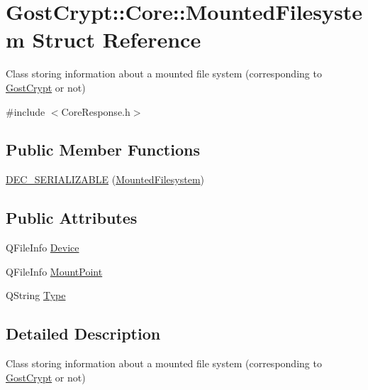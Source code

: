 \hypertarget{struct_gost_crypt_1_1_core_1_1_mounted_filesystem}{}\section{Gost\+Crypt\+:\+:Core\+:\+:Mounted\+Filesystem Struct Reference}
\label{struct_gost_crypt_1_1_core_1_1_mounted_filesystem}


Class storing information about a mounted file system (corresponding to \hyperlink{namespace_gost_crypt}{Gost\+Crypt} or not)  




{\ttfamily \#include $<$Core\+Response.\+h$>$}

\subsection*{Public Member Functions}
\begin{DoxyCompactItemize}
\item 
\hyperlink{struct_gost_crypt_1_1_core_1_1_mounted_filesystem_a3679182396a02d8728b5ff4d5c363edd}{D\+E\+C\+\_\+\+S\+E\+R\+I\+A\+L\+I\+Z\+A\+B\+LE} (\hyperlink{struct_gost_crypt_1_1_core_1_1_mounted_filesystem}{Mounted\+Filesystem})
\end{DoxyCompactItemize}
\subsection*{Public Attributes}
\begin{DoxyCompactItemize}
\item 
Q\+File\+Info \hyperlink{struct_gost_crypt_1_1_core_1_1_mounted_filesystem_a3284108b3f0deb35fb27848f5c5ed3ee}{Device}
\item 
Q\+File\+Info \hyperlink{struct_gost_crypt_1_1_core_1_1_mounted_filesystem_a122ef9f2f725100c1cfb1d71fcab73c1}{Mount\+Point}
\item 
Q\+String \hyperlink{struct_gost_crypt_1_1_core_1_1_mounted_filesystem_a8ec3ff52e01e3d5f6b22237c30cc392d}{Type}
\end{DoxyCompactItemize}


\subsection{Detailed Description}
Class storing information about a mounted file system (corresponding to \hyperlink{namespace_gost_crypt}{Gost\+Crypt} or not) 

